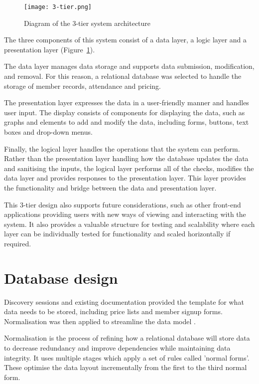 \begin{figure}[ht!]
    \centerline{\texttt{[image: 3-tier.png]}}
    \caption{Diagram of the 3-tier system architecture}
    \label{fig:sysarch}
\end{figure}

The three components of this system consist of a data layer, a logic layer and a presentation layer (Figure~\ref{fig:sysarch}). 

The data layer manages data storage and supports data submission, modification, and removal. For this reason, a relational database was selected to handle the storage of member records, attendance and pricing.

The presentation layer expresses the data in a user-friendly manner and handles user input. The display consists of components for displaying the data, such as graphs and elements to add and modify the data, including forms, buttons, text boxes and drop-down menus.

Finally, the logical layer handles the operations that the system can perform. Rather than the presentation layer handling how the database updates the data and sanitising the inputs, the logical layer performs all of the checks, modifies the data layer and provides responses to the presentation layer. This layer provides the functionality and bridge between the data and presentation layer.

This 3-tier design also supports future considerations, such as other front-end applications providing users with new ways of viewing and interacting with the system. It also provides a valuable structure for testing and scalability where each layer can be individually tested for functionality and scaled horizontally if required.



\section{Database design}
Discovery sessions and existing documentation provided the template for what data needs to be stored, including price lists and member signup forms. Normalisation was then applied to streamline the data model \parencite{date_database_2019}.

Normalisation is the process of refining how a relational database will store data to decrease redundancy and improve dependencies while maintaining data integrity. It uses multiple stages which apply a set of rules called 'normal forms'. These optimise the data layout incrementally from the first to the third normal form.

